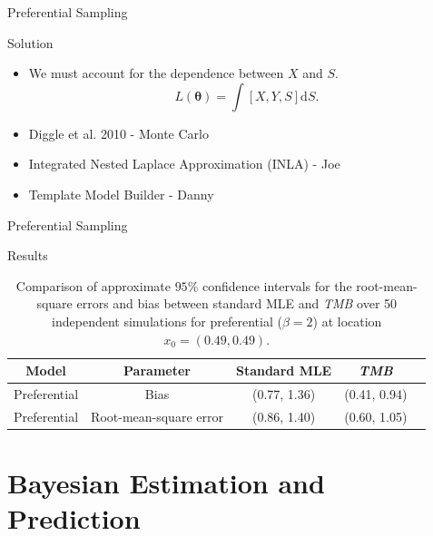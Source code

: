 \documentclass{beamer}
\begin{document}
\begin{frame}{Preferential Sampling}
\begin{block}{Solution}
\begin{itemize}
\item We must account for the dependence between $X$ and $S$.
\begin{equation}
L(\boldsymbol{\theta})=\int \left[X,Y,S\right]\mathrm{d}S.
\end{equation}
\item Diggle et al. 2010 - Monte Carlo 
\item Integrated Nested Laplace Approximation (INLA) - Joe
\item Template Model Builder - Danny
\end{itemize}
\end{block}
\end{frame}

\begin{frame}{Preferential Sampling}
\begin{block}{Results}
\small
\begin{table}[ht]
\centering
    \begin{tabular}{| c | c | c | c | c |}
    \hline
    Model & Parameter  & Standard MLE & {\it TMB} \\ \hline
    Preferential & Bias & (0.77, 1.36)  & (0.41, 0.94) \\
    Preferential & Root-mean-square error & (0.86, 1.40) & (0.60, 1.05)  \\ \hline
\end{tabular}
    \caption {Comparison of approximate $95\%$ confidence intervals for the root-mean-square errors and bias between standard MLE and {\it TMB} over 50 independent simulations for preferential ($\beta=2$) at location $x_0=(0.49, 0.49)$.}
 \label{table:simtable}
\end{table}
\normalsize
\end{block}

\end{frame}

\section{Bayesian Estimation and Prediction}
\end{document}
